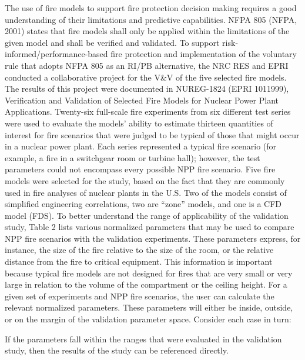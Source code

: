 \documentclass[fleqn,b5paper]{article}
\begin{document}
The use of fire models to support fire protection decision making requires a good understanding of their limitations and predictive capabilities. NFPA 805 (NFPA, 2001) states that fire models shall only be applied within the limitations of the given model and shall be verified and validated. To support risk-informed/performance-based fire protection and implementation of the voluntary rule that adopts NFPA 805 as an RI/PB alternative, the NRC RES and EPRI conducted a collaborative project for the V\&V of the five selected fire models. The results of this project were documented in NUREG-1824 (EPRI 1011999), Verification and Validation of Selected Fire Models for Nuclear Power Plant Applications.
Twenty-six full-scale fire experiments from six different test series were used to evaluate the models' ability to estimate thirteen quantities of interest for fire scenarios that were judged to be typical of those that might occur in a nuclear power plant. Each series represented a typical fire scenario (for example, a fire in a switchgear room or turbine hall); however, the test parameters could not encompass every possible NPP fire scenario. Five fire models were selected for the study, based on the fact that they are commonly used in fire analyses of nuclear plants in the U.S. Two of the models consist of simplified engineering correlations, two are ``zone'' models, and one is a CFD model (FDS).
To better understand the range of applicability of the validation study, Table 2 lists various normalized parameters that may be used to compare NPP fire scenarios with the validation experiments. These parameters express, for instance, the size of the fire relative to the size of the room, or the relative distance from the fire to critical equipment. This information is important because typical fire models are not designed for fires that are very small or very large in relation to the volume of the compartment or the ceiling height. For a given set of experiments and NPP fire scenarios, the user can calculate the relevant normalized parameters. These parameters will either be inside, outside, or on the margin of the validation parameter space. Consider each case in turn:

If the parameters fall within the ranges that were evaluated in the validation study, then the results of the study can be referenced directly.
\end{document}
